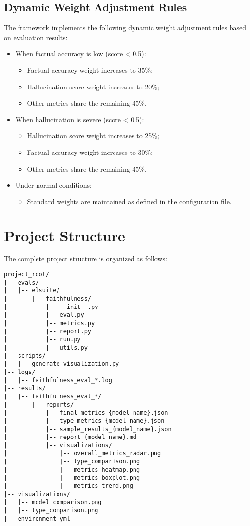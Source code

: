 \subsection{Dynamic Weight Adjustment Rules}
The framework implements the following dynamic weight adjustment rules based on evaluation results:

\begin{itemize}
    \item When factual accuracy is low (score < 0.5):
    \begin{itemize}
        \item Factual accuracy weight increases to 35\%;
        \item Hallucination score weight increases to 20\%;
        \item Other metrics share the remaining 45\%.
    \end{itemize}
    
    \item When hallucination is severe (score < 0.5):
    \begin{itemize}
        \item Hallucination score weight increases to 25\%;
        \item Factual accuracy weight increases to 30\%;
        \item Other metrics share the remaining 45\%.
    \end{itemize}
    
    \item Under normal conditions:
    \begin{itemize}
        \item Standard weights are maintained as defined in the configuration file.
    \end{itemize}
\end{itemize}

\section{Project Structure}
The complete project structure is organized as follows:

\begin{lstlisting}[language=Text, breaklines=true, basicstyle=\ttfamily\scriptsize]
project_root/
|-- evals/
|   |-- elsuite/
|       |-- faithfulness/
|           |-- __init__.py
|           |-- eval.py
|           |-- metrics.py
|           |-- report.py
|           |-- run.py
|           |-- utils.py
|-- scripts/
|   |-- generate_visualization.py
|-- logs/
|   |-- faithfulness_eval_*.log
|-- results/
|   |-- faithfulness_eval_*/
|       |-- reports/
|           |-- final_metrics_{model_name}.json
|           |-- type_metrics_{model_name}.json
|           |-- sample_results_{model_name}.json
|           |-- report_{model_name}.md
|           |-- visualizations/
|               |-- overall_metrics_radar.png
|               |-- type_comparison.png
|               |-- metrics_heatmap.png
|               |-- metrics_boxplot.png
|               |-- metrics_trend.png
|-- visualizations/
|   |-- model_comparison.png
|   |-- type_comparison.png
|-- environment.yml
\end{lstlisting}
